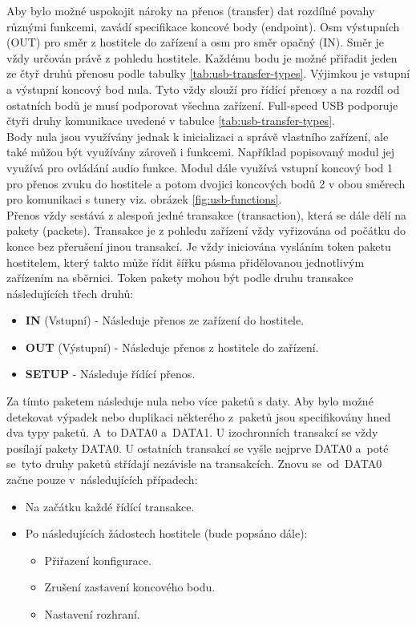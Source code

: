 Aby bylo možné uspokojit nároky na přenos (transfer) dat rozdílné povahy různými funkcemi, zavádí specifikace koncové body (endpoint). Osm výstupních (OUT) pro směr z hostitele do zařízení a osm pro směr opačný (IN). Směr je vždy určován právě z pohledu hostitele. Každému bodu je možné přiřadit jeden ze čtyř druhů přenosu podle tabulky \ref{tab:usb-transfer-types}. Výjimkou je  vstupní a výstupní koncový bod nula. Tyto vždy slouží pro řídící přenosy a na rozdíl od ostatních bodů je musí podporovat všechna zařízení.
Full-speed USB podporuje čtyři druhy komunikace uvedené v tabulce \ref{tab:usb-transfer-types}.\\ 
Body nula jsou využívány jednak k inicializaci a správě vlastního zařízení, ale také můžou být využívány zároveň i funkcemi. Například popisovaný modul jej využívá pro ovládání audio funkce.
Modul dále využívá vstupní koncový bod 1 pro přenos zvuku do hostitele a potom dvojici koncových bodů 2 v obou směrech pro komunikaci s tunery viz. obrázek \ref{fig:usb-functions}.\\
Přenos vždy sestává z alespoň jedné transakce (transaction), která se dále dělí na pakety (packets). Transakce je z pohledu zařízení vždy vyřizována od počátku do konce bez přerušení jinou transakcí. Je vždy iniciována vysláním token paketu hostitelem, který takto může řídit šířku pásma přidělovanou jednotlivým zařízením na sběrnici. Token pakety mohou být podle druhu transakce následujících třech druhů:
\begin{itemize}
\item \textbf{IN} (Vstupní) - Následuje přenos ze zařízení do hostitele.
\item \textbf{OUT} (Výstupní) - Následuje přenos z hostitele do zařízení.
\item \textbf{SETUP} - Následuje řídící přenos. %
\end{itemize}
Za tímto paketem následuje nula nebo více paketů s daty. Aby bylo možné detekovat výpadek nebo duplikaci některého z~paketů jsou specifikovány hned dva typy paketů. A~to DATA0 a~DATA1. U izochronních transakcí se vždy posílají pakety DATA0. U ostatních transakcí se vyšle nejprve DATA0 a~poté se~tyto druhy paketů střídají nezávisle na transakcích. Znovu se~od~DATA0 začne pouze v~následujících případech:
\begin{itemize}
\item Na začátku každé řídící transakce.
\item Po následujících žádostech hostitele (bude popsáno dále):
\begin{itemize}
\item Přiřazení konfigurace.
\item Zrušení zastavení koncového bodu.
\item Nastavení rozhraní.
\end{itemize}
\end{itemize}

